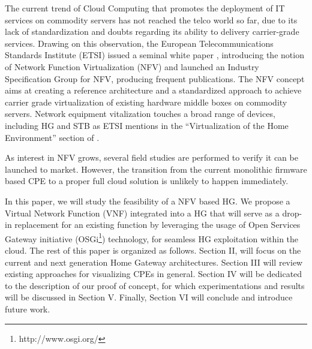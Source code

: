The current trend of Cloud Computing that promotes the deployment of IT services on commodity servers has not reached the telco world so far, due to its lack of standardization and doubts regarding its ability to delivery carrier-grade services. Drawing on this observation, the European Telecommunications Standards Institute (ETSI) issued a seminal white paper \cite{_network_2012}, introducing the notion of Network Function Virtualization (NFV) and launched an Industry Specification Group for NFV, producing frequent publications.
The NFV concept aims at creating a reference architecture and a standardized approach to achieve carrier grade virtualization of existing hardware middle boxes on commodity servers.
Network equipment vitalization touches a broad range of devices, including HG and STB as ETSI mentions in the “Virtualization of the Home Environment” section of \cite{_network_2013}. 

As interest in NFV grows, several field studies are performed to verify it can be launched to market.
However, the transition from the current monolithic firmware based CPE to a proper full cloud solution is unlikely to happen immediately.

In this paper, we will study the feasibility of a NFV based HG. We propose a Virtual Network Function (VNF) integrated into a HG that will serve as a drop-in replacement for an existing function by leveraging the usage of Open Services Gateway initiative (OSGi\footnote{http://www.osgi.org/}) technology, for seamless HG exploitation within the cloud.
The rest of this paper is organized as follows.
Section II, will focus on the current and next generation Home Gateway architectures.
Section III will review existing approaches for visualizing CPEs in general.
Section IV will be dedicated to the description of our proof of concept, for which experimentations and results will be discussed in Section V.
Finally, Section VI will conclude and introduce future work.


